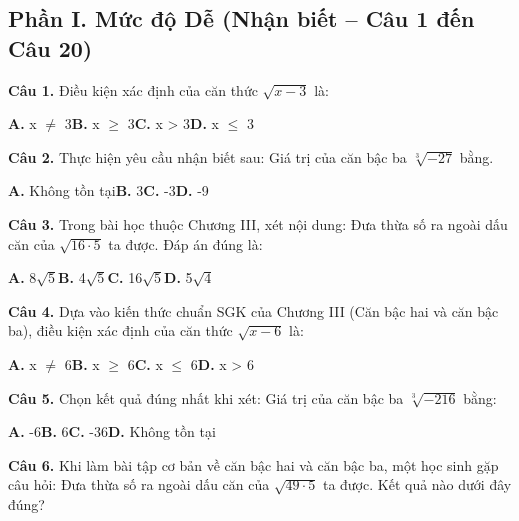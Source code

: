 \documentclass[11pt,a4paper]{article}
\begin{document}
\subsection*{\color{accent} Phần I. Mức độ Dễ (Nhận biết -- Câu 1 đến Câu 20)}
\textbf{\color{primary} Câu 1.} Điều kiện xác định của căn thức $\sqrt{x - 3}$ là:\par
\hspace*{1.5em}\textbf{A.} x $\ne$ 3\quad\quad \textbf{B.} x $\ge$ 3\quad\quad \textbf{C.} x > 3\quad\quad \textbf{D.} x $\le$ 3\par\vspace{2pt}
\textbf{\color{primary} Câu 2.} Thực hiện yêu cầu nhận biết sau: Giá trị của căn bậc ba $\sqrt[3]{-27}$ bằng.\par
\hspace*{1.5em}\textbf{A.} Không tồn tại\quad\quad \textbf{B.} 3\quad\quad \textbf{C.} -3\quad\quad \textbf{D.} -9\par\vspace{2pt}
\textbf{\color{primary} Câu 3.} Trong bài học thuộc Chương III, xét nội dung: Đưa thừa số ra ngoài dấu căn của $\sqrt{16  \cdot  5}$ ta được. Đáp án đúng là:\par
\hspace*{1.5em}\textbf{A.} 8$\sqrt{5}$\quad\quad \textbf{B.} 4$\sqrt{5}$\quad\quad \textbf{C.} 16$\sqrt{5}$\quad\quad \textbf{D.} 5$\sqrt{4}$\par\vspace{2pt}
\textbf{\color{primary} Câu 4.} Dựa vào kiến thức chuẩn SGK của Chương III (Căn bậc hai và căn bậc ba), điều kiện xác định của căn thức $\sqrt{x - 6}$ là:\par
\hspace*{1.5em}\textbf{A.} x $\ne$ 6\quad\quad \textbf{B.} x $\ge$ 6\quad\quad \textbf{C.} x $\le$ 6\quad\quad \textbf{D.} x > 6\par\vspace{2pt}
\textbf{\color{primary} Câu 5.} Chọn kết quả đúng nhất khi xét: Giá trị của căn bậc ba $\sqrt[3]{-216}$ bằng:\par
\hspace*{1.5em}\textbf{A.} -6\quad\quad \textbf{B.} 6\quad\quad \textbf{C.} -36\quad\quad \textbf{D.} Không tồn tại\par\vspace{2pt}
\textbf{\color{primary} Câu 6.} Khi làm bài tập cơ bản về căn bậc hai và căn bậc ba, một học sinh gặp câu hỏi: Đưa thừa số ra ngoài dấu căn của $\sqrt{49  \cdot  5}$ ta được. Kết quả nào dưới đây đúng?\par
\end{document}
